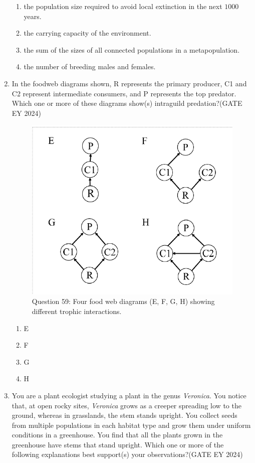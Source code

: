 \begin{enumerate}
    \begin{enumerate}
        \item the population size required to avoid local extinction in the next $1000$ years.
        \item the carrying capacity of the environment.
        \item the sum of the sizes of all connected populations in a metapopulation.
        \item the number of breeding males and females.
    \end{enumerate}
\item In the foodweb diagrams shown, R represents the primary producer, C1 and C2 represent intermediate consumers, and P represents the top predator. Which one or more of these diagrams show(s) intraguild predation?\hfill{(GATE EY 2024)}
\begin{figure}[!ht]
    \centering
    \includegraphics[width=0.3\columnwidth]{figs/Q-59.png}
    \caption{Question 59: Four food web diagrams (E, F, G, H) showing different trophic interactions.}
    \label{Q.59}
\end{figure}
    \begin{multicols}{2}
    \begin{enumerate}
        \item E
        \item F
        \item G
        \item H
    \end{enumerate}
    \end{multicols}
\item You are a plant ecologist studying a plant in the genus \textit{Veronica}. You notice that, at open rocky sites, \textit{Veronica} grows as a creeper spreading low to the ground, whereas in grasslands, the stem stands upright. You collect seeds from multiple populations in each habitat type and grow them under uniform conditions in a greenhouse. You find that all the plants grown in the greenhouse have stems that stand upright. Which one or more of the following explanations best support(s) your observations?\hfill{(GATE EY 2024)}
    \begin{enumerate}

\end{enumerate}
\end{enumerate}
